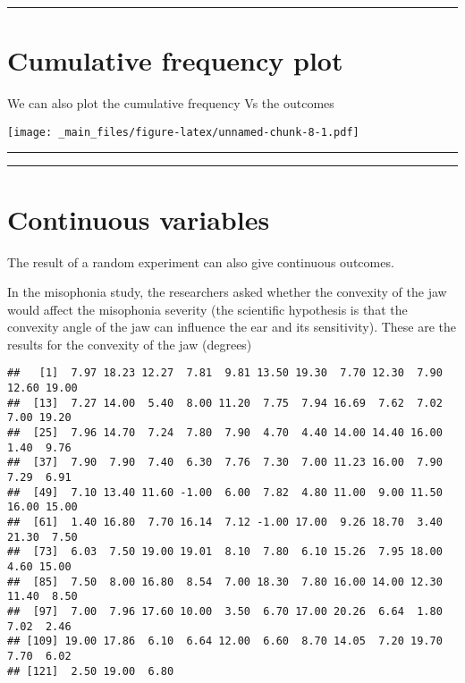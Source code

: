 \documentclass[
]{book}
\begin{document}
\begin{center}\rule{0.5\linewidth}{0.5pt}\end{center}

\hypertarget{cumulative-frequency-plot}{%
\section{Cumulative frequency plot}\label{cumulative-frequency-plot}}

We can also plot the cumulative frequency Vs the outcomes

\texttt{[image: \_main\_files/figure-latex/unnamed-chunk-8-1.pdf]}

\begin{center}\rule{0.5\linewidth}{0.5pt}\end{center}

\begin{center}\rule{0.5\linewidth}{0.5pt}\end{center}

\hypertarget{continuous-variables}{%
\section{Continuous variables}\label{continuous-variables}}

The result of a random experiment can also give continuous outcomes.

In the misophonia study, the researchers asked whether the convexity of the jaw would affect the misophonia severity (the scientific hypothesis is that the convexity angle of the jaw can influence the ear and its sensitivity). These are the results for the convexity of the jaw (degrees)

\begin{verbatim}
##   [1]  7.97 18.23 12.27  7.81  9.81 13.50 19.30  7.70 12.30  7.90 12.60 19.00
##  [13]  7.27 14.00  5.40  8.00 11.20  7.75  7.94 16.69  7.62  7.02  7.00 19.20
##  [25]  7.96 14.70  7.24  7.80  7.90  4.70  4.40 14.00 14.40 16.00  1.40  9.76
##  [37]  7.90  7.90  7.40  6.30  7.76  7.30  7.00 11.23 16.00  7.90  7.29  6.91
##  [49]  7.10 13.40 11.60 -1.00  6.00  7.82  4.80 11.00  9.00 11.50 16.00 15.00
##  [61]  1.40 16.80  7.70 16.14  7.12 -1.00 17.00  9.26 18.70  3.40 21.30  7.50
##  [73]  6.03  7.50 19.00 19.01  8.10  7.80  6.10 15.26  7.95 18.00  4.60 15.00
##  [85]  7.50  8.00 16.80  8.54  7.00 18.30  7.80 16.00 14.00 12.30 11.40  8.50
##  [97]  7.00  7.96 17.60 10.00  3.50  6.70 17.00 20.26  6.64  1.80  7.02  2.46
## [109] 19.00 17.86  6.10  6.64 12.00  6.60  8.70 14.05  7.20 19.70  7.70  6.02
## [121]  2.50 19.00  6.80
\end{verbatim}
\end{document}
